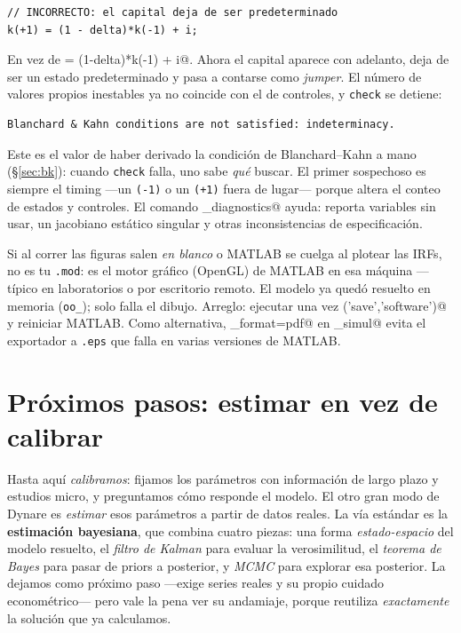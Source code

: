 \documentclass[11pt,a4paper]{report}
\newcounter{tcbrem}[section]
\renewcommand{\thetcbrem}{\thesection.\arabic{tcbrem}}
\newenvironment{remark}{%
  \refstepcounter{tcbrem}%
  \begin{tcolorbox}[remarkstyle, title={Observación~\thetcbrem}]}%
{\end{tcolorbox}}
\newenvironment{errorbox}[1][]{%
  \begin{tcolorbox}[errorstyle, title={\erroricon~~Error común%
    \ifx\relax#1\relax\else: #1\fi}]}%
{\end{tcolorbox}}
\newcommand{\code}[1]{\texttt{#1}}
\newcommand{\erroricon}{\raisebox{-0.5pt}{\begin{tikzpicture}[scale=0.11,baseline=-0.5ex]
  \draw[line width=2.4pt, line join=round] (0,1.9) -- (-1.1,-0.05) -- (1.1,-0.05) -- cycle;
  \draw[line width=2.2pt, line cap=round] (0,1.28) -- (0,0.58);
  \fill (0,0.28) circle (1.7pt);
\end{tikzpicture}}}
\begin{document}
\begin{lstlisting}[numbers=none,basicstyle=\ttfamily\footnotesize]
// INCORRECTO: el capital deja de ser predeterminado
k(+1) = (1 - delta)*k(-1) + i;
\end{lstlisting}

\noindent En vez de \lstinline@k = (1-delta)*k(-1) + i@. Ahora el capital aparece
con adelanto, deja de ser un estado predeterminado y pasa a contarse como
\emph{jumper}. El número de valores propios inestables ya no coincide con el de
controles, y \code{check} se detiene:

\begin{lstlisting}[numbers=none,basicstyle=\ttfamily\footnotesize]
Blanchard & Kahn conditions are not satisfied: indeterminacy.
\end{lstlisting}

\begin{remark}
Este es el valor de haber derivado la condición de Blanchard--Kahn a mano
(\S\ref{sec:bk}): cuando \code{check} falla, uno sabe \emph{qué} buscar. El
primer sospechoso es siempre el timing ---un \code{(-1)} o un \code{(+1)} fuera
de lugar--- porque altera el conteo de estados y controles. El comando
\lstinline@model_diagnostics@ ayuda: reporta variables sin usar, un jacobiano
estático singular y otras inconsistencias de especificación.
\end{remark}

\begin{errorbox}[un tropiezo que no es del modelo: los gráficos]
Si al correr las figuras salen \emph{en blanco} o MATLAB se cuelga al plotear las
IRFs, no es tu \code{.mod}: es el motor gráfico (OpenGL) de MATLAB en esa máquina
---típico en laboratorios o por escritorio remoto. El modelo ya quedó resuelto en
memoria (\code{oo\_}); solo falla el dibujo. Arreglo: ejecutar una vez
\lstinline@opengl('save','software')@ y reiniciar MATLAB. Como alternativa,
\lstinline@graph_format=pdf@ en \lstinline@stoch_simul@ evita el exportador a
\code{.eps} que falla en varias versiones de MATLAB.
\end{errorbox}

\section{Próximos pasos: estimar en vez de calibrar}
\label{sec:bayes}

Hasta aquí \emph{calibramos}: fijamos los parámetros con información de largo
plazo y estudios micro, y preguntamos cómo responde el modelo. El otro gran modo
de Dynare es \emph{estimar} esos parámetros a partir de datos reales. La vía
estándar es la \textbf{estimación bayesiana}, que combina cuatro piezas: una forma
\emph{estado-espacio} del modelo resuelto, el \emph{filtro de Kalman} para evaluar
la verosimilitud, el \emph{teorema de Bayes} para pasar de priors a posterior, y
\emph{MCMC} para explorar esa posterior. La dejamos como próximo paso ---exige
series reales y su propio cuidado econométrico--- pero vale la pena ver su
andamiaje, porque reutiliza \emph{exactamente} la solución que ya calculamos.
\end{document}
